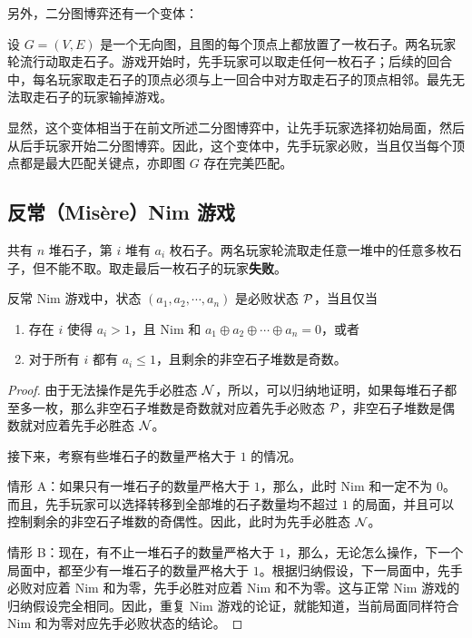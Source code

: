 另外，二分图博弈还有一个变体：

\begin{game}[二分图博弈的变体]
	设 $G=(V,E)$ 是一个无向图，且图的每个顶点上都放置了一枚石子。两名玩家轮流行动取走石子。游戏开始时，先手玩家可以取走任何一枚石子；后续的回合中，每名玩家取走石子的顶点必须与上一回合中对方取走石子的顶点相邻。最先无法取走石子的玩家输掉游戏。
\end{game}

显然，这个变体相当于在前文所述二分图博弈中，让先手玩家选择初始局面，然后从后手玩家开始二分图博弈。因此，这个变体中，先手玩家必败，当且仅当每个顶点都是最大匹配关键点，亦即图 $G$ 存在完美匹配。

\subsection{反常（Mis\`ere）Nim 游戏}

\begin{game}[反常 Nim]
	共有 $n$ 堆石子，第 $i$ 堆有 $a_i$ 枚石子。两名玩家轮流取走任意一堆中的任意多枚石子，但不能不取。取走最后一枚石子的玩家\textbf{失败}。
\end{game}

\begin{theorem}
	反常 Nim 游戏中，状态 $(a_1,a_2,\cdots,a_n)$ 是必败状态 $\mathcal{P}$，当且仅当
	\begin{enumerate}
		\item 存在 $i$ 使得 $a_i>1$，且 Nim 和 $a_1\oplus a_2\oplus\cdots\oplus a_n=0$，或者
		\item 对于所有 $i$ 都有 $a_i\le 1$，且剩余的非空石子堆数是奇数。
	\end{enumerate}
\end{theorem}

\begin{proof}
	由于无法操作是先手必胜态 $\mathcal{N}$，所以，可以归纳地证明，如果每堆石子都至多一枚，那么非空石子堆数是奇数就对应着先手必败态 $\mathcal{P}$，非空石子堆数是偶数就对应着先手必胜态 $\mathcal{N}$。
	
	接下来，考察有些堆石子的数量严格大于 $1$ 的情况。
	
	情形 A：如果只有一堆石子的数量严格大于 $1$，那么，此时 Nim 和一定不为 $0$。而且，先手玩家可以选择转移到全部堆的石子数量均不超过 $1$ 的局面，并且可以控制剩余的非空石子堆数的奇偶性。因此，此时为先手必胜态 $\mathcal{N}$。
	
	情形 B：现在，有不止一堆石子的数量严格大于 $1$，那么，无论怎么操作，下一个局面中，都至少有一堆石子的数量严格大于 $1$。根据归纳假设，下一局面中，先手必败对应着 Nim 和为零，先手必胜对应着 Nim 和不为零。这与正常 Nim 游戏的归纳假设完全相同。因此，重复 Nim 游戏的论证，就能知道，当前局面同样符合 Nim 和为零对应先手必败状态的结论。
\end{proof}

